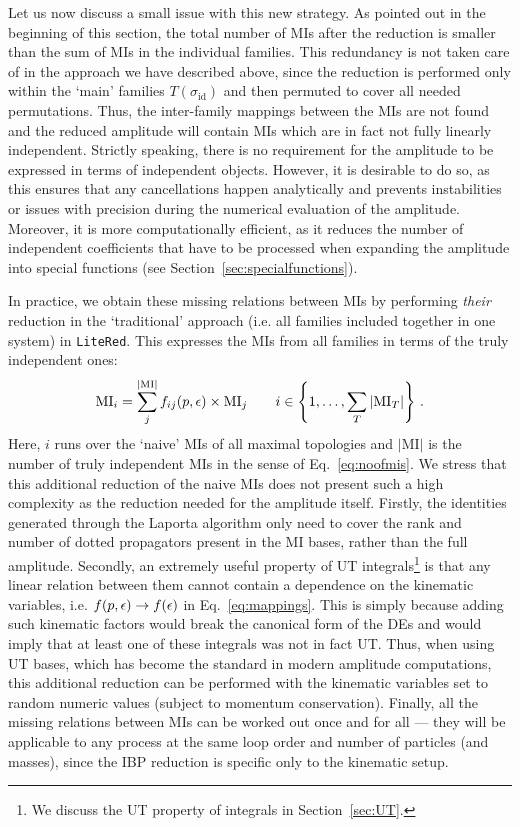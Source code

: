 \documentclass[main.tex]{subfiles}
\begin{document}
Let us now discuss a small issue with this new strategy. As pointed out in the beginning of this section, the total number of MIs after the reduction is smaller than the sum of MIs in the individual families. This redundancy is not taken care of in the approach we have described above, since the reduction is performed only within the ‘main’ families $T(\sigma_\text{id})$ and then permuted to cover all needed permutations. Thus, the inter-family mappings between the MIs are not found and the reduced amplitude will contain MIs which are in fact not fully linearly independent. Strictly speaking, there is no requirement for the amplitude to be expressed in terms of independent objects. However, it is desirable to do so, as this ensures that any cancellations happen analytically and prevents instabilities or issues with precision during the numerical evaluation of the amplitude. Moreover, it is more computationally efficient, as it reduces the number of independent coefficients that have to be processed when expanding the amplitude into special functions (see Section~\ref{sec:specialfunctions}).

In practice, we obtain these missing relations between MIs by performing \textit{their} reduction in the `traditional' approach (i.e. all families included together in one system) in \texttt{LiteRed}. This expresses the MIs from all families in terms of the truly independent ones:
\begin{equation} \label{eq:mappings}
    \text{MI}_{i} = \sum_j^{|\text{MI}|} f_{ij}(p, \epsilon) \times \text{MI}_j \qquad i \in \left\{1, \ldots, \sum_T |\text{MI}_T|\right\}\,.
\end{equation}
Here, $i$ runs over the `naive' MIs of all maximal topologies and $|\text{MI}|$ is the number of truly independent MIs in the sense of Eq.~\ref{eq:noofmis}. We stress that this additional reduction of the naive MIs does not present such a high complexity as the reduction needed for the amplitude itself. Firstly, the identities generated through the Laporta algorithm only need to cover the rank and number of dotted propagators present in the MI bases, rather than the full amplitude. Secondly, an extremely useful property of UT integrals\footnote{We discuss the UT property of integrals in Section~\ref{sec:UT}.} is that any linear relation between them cannot contain a dependence on the kinematic variables, i.e. $f(p, \epsilon) \rightarrow f(\epsilon)$ in Eq.~\ref{eq:mappings}. This is simply because adding such kinematic factors would break the canonical form of the DEs and would imply that at least one of these integrals was not in fact UT. Thus, when using UT bases, which has become the standard in modern amplitude computations, this additional reduction can be performed with the kinematic variables set to random numeric values (subject to momentum conservation). Finally, all the missing relations between MIs can be worked out once and for all --- they will be applicable to any process at the same loop order and number of particles (and masses), since the IBP reduction is specific only to the kinematic setup.
\end{document}
